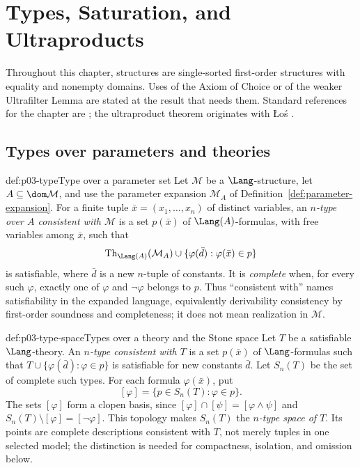 \chapter{Types, Saturation, and Ultraproducts}
\label{sec:p03-types-ultraproducts}

Throughout this chapter, structures are single-sorted first-order structures
with equality and nonempty domains.  Uses of the Axiom of Choice or of the
weaker Ultrafilter Lemma are stated at the result that needs them.  Standard
references for the chapter are \cite{ChangKeisler1990,Hodges1993,Marker2002};
the ultraproduct theorem originates with \L o\'s \cite{Los1955}.

\section{Types over parameters and theories}
\label{sec:p03-types}

\begin{hbdefinition}{def:p03-type}{Type over a parameter set}
Let \(\mathcal M\) be a \(\Lang\)-structure, let
\(A\subseteq\dom\mathcal M\), and use the parameter expansion
\(\mathcal M_A\) of Definition~\ref{def:parameter-expansion}.  For a
finite tuple \(\bar x=(x_1,\ldots,x_n)\) of distinct variables, an
\emph{\(n\)-type over \(A\) consistent with \(\mathcal M\)} is a set
\(p(\bar x)\) of \(\Lang(A)\)-formulas, with free variables among \(\bar x\),
such that
\[
 \operatorname{Th}_{\Lang(A)}(\mathcal M_A)
 \cup\{\varphi(\bar d):\varphi(\bar x)\in p\}
\]
is satisfiable, where \(\bar d\) is a new \(n\)-tuple of constants.  It is
\emph{complete} when, for every such \(\varphi\), exactly one of
\(\varphi\) and \(\neg\varphi\) belongs to \(p\).  Thus ``consistent with''
names satisfiability in the expanded language, equivalently derivability
consistency by first-order soundness and completeness; it does not mean
realization in \(\mathcal M\).
\end{hbdefinition}

\begin{hbdefinition}{def:p03-type-space}{Types over a theory and the Stone space}
Let \(T\) be a satisfiable \(\Lang\)-theory.  An \emph{\(n\)-type consistent
with \(T\)} is a set \(p(\bar x)\) of \(\Lang\)-formulas such that
\(T\cup\{\varphi(\bar d):\varphi\in p\}\) is satisfiable for new constants
\(\bar d\).  Let \(S_n(T)\) be the set of complete such types.  For each
formula \(\varphi(\bar x)\), put
\[
 [\varphi]=\{p\in S_n(T):\varphi\in p\}.
\]
The sets \([\varphi]\) form a clopen basis, since
\([\varphi]\cap[\psi]=[\varphi\land\psi]\) and
\(S_n(T)\setminus[\varphi]=[\neg\varphi]\).  This topology makes
\(S_n(T)\) the \emph{\(n\)-type space of \(T\)}.  Its points are complete
descriptions consistent with \(T\), not merely tuples in one selected model;
the distinction is needed for compactness, isolation, and omission below.
\end{hbdefinition}

